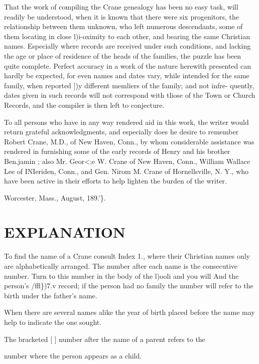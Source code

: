 \documentclass[oneside]{book}
\begin{document}
That the work of compiling the Crane genealogy has been no 
easy task, will readily be understood, when it is known that there 
were six progenitors, the relationship between them unknown, 
who left numerous descendants, some of them locating in close 
l)i-oximity to each other, and bearing the same Christian names. 
Especially where records are received under such conditions, and 
lacking the age or place of residence of the heads of the families, 
the puzzle has been quite complete. Perfect accuracy in a work 
of the nature herewith presented can hardly be expected, for even 
names and dates vary, while intended for the same family, when 
reported ])y different memliers of the family; and not infre- 
quently, dates given in such records will not correspond with 
tliose of the Town or Church Records, and the compiler is then 
left to conjecture. 

To all persons who have in any way rendered aid in this work, 
the writer would return grateful acknowledgments, and especially 
does he desire to remember Robert Crane, M.D., of New 
Haven, Conn., by whom considerable assistance was rendered in 
furnishing some of the early records of Henry and his brother 
Ben.jamin ; also Mr. Geor<;e W. Crane of New Haven, Conn., 
William Wallace Lee of INIeriden, Conn., and Gen. Nirom M. 
Crane of Hornellsville, N. Y., who have been active in their 
efforts to help lighten the burden of the writer. 


Worcester, Mass., August, 189.'\}. 



\section{EXPLANATION} 



To find the name of a Crane consult Index 1., where their Christian 
names only are alphabetically arranged. The number after each name 
is the consecutive number. Turn to this number in the body of the 
l)ooli and you will And the person's /ffl\})7.v record; if the person had no 
family the number will refer to the birth under the father's name. 

When there are several names alike the year of birth placed before the 
name may help to indicate the one sought. 

The bracketed [ ] number after the name of a parent refers to the 

number where the person appears as a child. 
\end{document}
